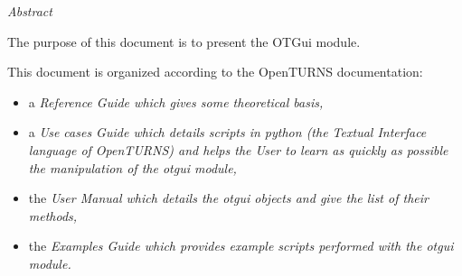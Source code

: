 %  
\vspace{0.5in}
\begin{center}
\vspace{0.3in}
\emph{ Abstract}
\vspace{0.5in}
\end{center}

The purpose of this document is to present the OTGui module.

This document is organized according to the OpenTURNS documentation:
\begin{itemize}
\item a \itshape{Reference Guide} which gives some theoretical basis,
\item a \itshape{Use cases Guide} which details scripts in python (the Textual Interface language of OpenTURNS) and helps the User to learn as quickly as possible the manipulation of the \textit{otgui} module,
\item the \itshape{User Manual} which details the \textit{otgui} objects and give the list of their methods,
\item the \itshape{Examples Guide} which provides example scripts performed with the \textit{otgui} module.
\end{itemize}

